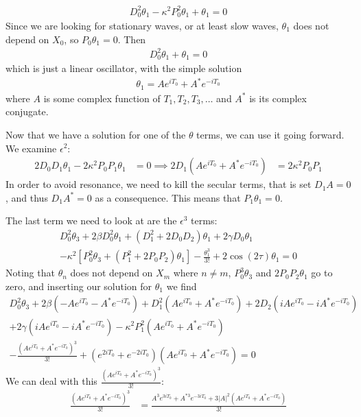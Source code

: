 \documentclass[11pt]{article}
\numberwithin{equation}{section}
\numberwithin{figure}{section}
\numberwithin{table}{section}
\begin{document}
\begin{align*}
    D_0^2\theta_1-\kappa^2P_0^2\theta_1+\theta_1=0
\end{align*}
Since we are looking for stationary waves, or at least slow waves, $\theta_1$ does not depend on $X_0$, so $P_0\theta_1=0$. Then
\begin{align*}
    D_0^2\theta_1+\theta_1=0
\end{align*}
which is just a linear oscillator, with the simple solution
\begin{align*}
    \theta_1=Ae^{iT_0}+A^*e^{-iT_0}
\end{align*}
where $A$ is some complex function of $T_1,T_2,T_3,\dots$ and $A^*$ is its complex conjugate. 
\par Now that we have a solution for one of the $\theta$ terms, we can use it going forward. We examine $\epsilon^2$:
\begin{align*}
    2D_0D_1\theta_1-2\kappa^2P_0P_1\theta_1&=0
    \implies 2D_1(Ae^{iT_0}+A^*e^{-iT_0})&=2\kappa^2P_0P_1
\end{align*}
In order to avoid resonance, we need to kill the secular terms, that is set $D_1A=0$, and thus $D_1A^*=0$ as a consequence. This means that $P_1\theta_1=0$.
\par The last term we need to look at are the $\epsilon^3$ terms:
\begin{align*}
    D_0^2\theta_3+2\beta D_0^2\theta_1+(D_1^2+2D_0D_2)\theta_1+2\gamma D_0\theta_1\\
    -\kappa^2[P_0^2\theta_3+(P_1^2+2P_0P_2)\theta_1]-\frac{\theta_1^3}{3!}+2\cos(2\tau)\theta_1=0
\end{align*}
Noting that $\theta_n$ does not depend on $X_m$ where $n\neq m$, $P_0^3\theta_3$ and $2P_0P_2\theta_1$ go to zero, and inserting our solution for $\theta_1$ we find
\begin{align*}
    D_0^2\theta_3+2\beta (-Ae^{iT_0}-A^*e^{-iT_0})+D_1^2(Ae^{iT_0}+A^*e^{-iT_0})+2D_2(iAe^{iT_0}-iA^*e^{-iT_0})\\
    +2\gamma(iAe^{iT_0}-iA^*e^{-iT_0})-\kappa^2P_1^2(Ae^{iT_0}+A^*e^{-iT_0})\\
    -\frac{(Ae^{iT_0}+A^*e^{-iT_0})^3}{3!}+(e^{2iT_0}+e^{-2iT_0})(Ae^{iT_0}+A^*e^{-iT_0})=0
\end{align*}
We can deal with this $\frac{(Ae^{iT_0}+A^*e^{-iT_0})^3}{3!}$:
\begin{align*}
    \frac{(Ae^{iT_0}+A^*e^{-iT_0})^3}{3!}&=\frac{A^3e^{3iT_0}+A^{*3}e^{-3iT_0}+3|A|^2(Ae^{iT_0}+A^*e^{-iT_0})}{3!}
\end{align*}
\end{document}

